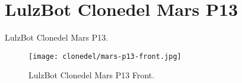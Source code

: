 %
%
%
%
%

\section{LulzBot Clonedel Mars P13}
LulzBot Clonedel Mars P13.

\begin{figure}[h!]
\texttt{[image: clonedel/mars-p13-front.jpg]}
 \caption{LulzBot Clonedel Mars P13 Front.}
 \label{fig:clonedel-mars-p13-front}
\end{figure}


